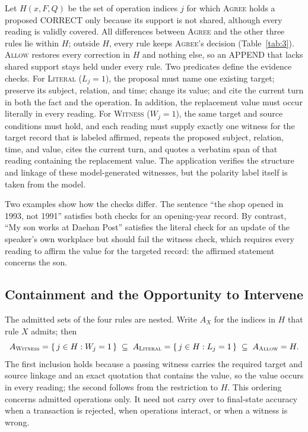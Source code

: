 \documentclass[acmsmall,review]{acmart}
\newcommand{\agree}{\textsc{Agree}}
\newcommand{\allow}{\textsc{Allow}}
\newcommand{\literal}{\textsc{Literal}}
\newcommand{\witness}{\textsc{Witness}}
\newcommand{\rulesub}[1]{\text{\textsc{#1}}}
\begin{document}
Let $H(x,F,Q)$ be the set of operation indices $j$ for which \agree{} holds a proposed CORRECT only because its support is not shared, although every reading is validly covered. All differences between \agree{} and the other three rules lie within $H$; outside $H$, every rule keeps \agree{}'s decision (Table~\ref{tab:3}). \allow{} restores every correction in $H$ and nothing else, so an APPEND that lacks shared support stays held under every rule. Two predicates define the evidence checks. For \literal{} ($L_j=1$), the proposal must name one existing target; preserve its subject, relation, and time; change its value; and cite the current turn in both the fact and the operation. In addition, the replacement value must occur literally in every reading. For \witness{} ($W_j=1$), the same target and source conditions must hold, and each reading must supply exactly one witness for the target record that is labeled affirmed, repeats the proposed subject, relation, time, and value, cites the current turn, and quotes a verbatim span of that reading containing the replacement value. The application verifies the structure and linkage of these model-generated witnesses, but the polarity label itself is taken from the model.

Two examples show how the checks differ. The sentence ``the shop opened in 1993, not 1991'' satisfies both checks for an opening-year record. By contrast, ``My son works at Daehan Post'' satisfies the literal check for an update of the speaker's own workplace but should fail the witness check, which requires every reading to affirm the value for the targeted record: the affirmed statement concerns the son.

\subsection{Containment and the Opportunity to Intervene}\label{sec:bound}
The admitted sets of the four rules are nested. Write $A_X$ for the indices in $H$ that rule $X$ admits; then
\begin{equation}
A_{\rulesub{Witness}}=\{\,j\in H : W_j=1\,\}\;\subseteq\; A_{\rulesub{Literal}}=\{\,j\in H : L_j=1\,\}\;\subseteq\; A_{\rulesub{Allow}}=H .
\label{eq:containment}
\end{equation}
The first inclusion holds because a passing witness carries the required target and source linkage and an exact quotation that contains the value, so the value occurs in every reading; the second follows from the restriction to $H$. This ordering concerns admitted operations only. It need not carry over to final-state accuracy when a transaction is rejected, when operations interact, or when a witness is wrong.
\end{document}
